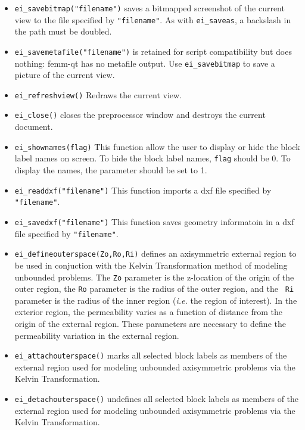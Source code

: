 \begin{itemize}
\item \texttt{ei\_savebitmap("filename")} saves a bitmapped screenshot of the current
view to the file specified by \texttt{"filename"}.  As with
\texttt{ei\_saveas}, a backslash in the path must be doubled.

\item \texttt{ei\_savemetafile("filename")} is retained for script
compatibility but does nothing: femm-qt has no metafile output. Use
\texttt{ei\_savebitmap} to save a picture of the current view.

\item \texttt{ei\_refreshview()} Redraws the current view.

\item \texttt{ei\_close()} closes the preprocessor window and
destroys the current document.

\item \texttt{ei\_shownames(flag)} This function allow the user to display or hide the
block label names on screen. To hide the block label names,
\texttt{flag} should be 0. To display the names, the parameter
should be set to 1.

\item{\tt ei\_readdxf("filename")} This function imports a dxf file specified by {\tt "filename"}.

\item{\tt ei\_savedxf("filename")} This function saves geometry informatoin in a dxf file specified by {\tt "filename"}.

\item{\tt ei\_defineouterspace(Zo,Ro,Ri)} defines
an axisymmetric external region to be used in conjuction with the
Kelvin Transformation method of modeling unbounded problems.  The
{\tt Zo} parameter is the z-location of the origin of the outer region,
the {\tt Ro} parameter is the radius of the outer region, and the {\tt
Ri} parameter is the radius of the inner region ({\em i.e.} the region of
interest). In the exterior region, the permeability varies as a function of
distance from the origin of the external region.  These parameters
are necessary to define the permeability variation in the external
region.

\item{\tt ei\_attachouterspace()} marks all
selected block labels as members of the external region used for
modeling unbounded axisymmetric problems via the Kelvin
Transformation.

\item{\tt ei\_detachouterspace()} undefines all selected block labels
as members of the external region used for modeling unbounded axisymmetric
problems via the Kelvin Transformation.


\end{itemize}
